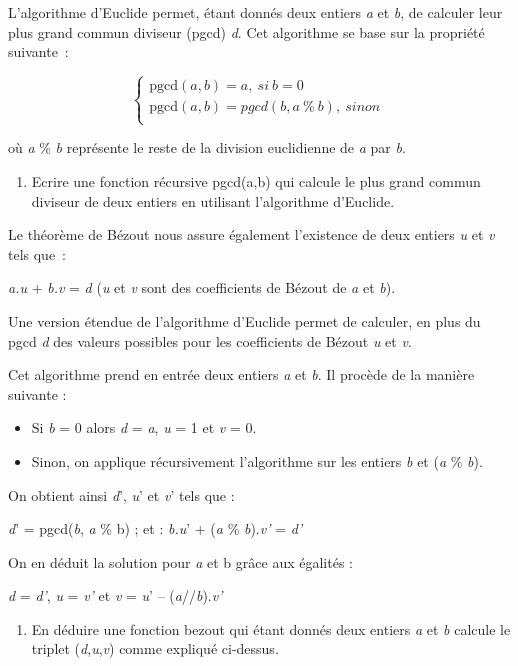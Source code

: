 \documentclass[
]{article}
\author{}
\date{}
\begin{document}
L'algorithme d'Euclide permet, étant donnés deux entiers \emph{a} et
\emph{b}, de calculer leur plus grand commun diviseur (pgcd) \emph{d}.
Cet algorithme se base sur la propriété suivante~:

\[\left\{ \begin{matrix}
\text{pgcd}\left( a,b \right) = a,\ si\ b = 0 \\
\text{pgcd}\left( a,b \right) = pgcd\left( b,a\ \%\ b \right),\ sinon \\
\end{matrix} \right.\ \]

où \emph{a} \% \emph{b} représente le reste de la division euclidienne
de \emph{a} par \emph{b}.

\begin{enumerate}
\def\labelenumi{\arabic{enumi}.}
\item
  Ecrire une fonction récursive pgcd(a,b) qui calcule le plus grand
  commun diviseur de deux entiers en utilisant l'algorithme d'Euclide.
\end{enumerate}

Le théorème de Bézout nous assure également l'existence de deux entiers
\emph{u} et \emph{v} tels que~:

\emph{a.u} + \emph{b.v} = \emph{d} (\emph{u} et \emph{v} sont des
coefficients de Bézout de \emph{a} et \emph{b}).

Une version étendue de l'algorithme d'Euclide permet de calculer, en
plus du pgcd \emph{d} des valeurs possibles pour les coefficients de
Bézout \emph{u} et \emph{v}.

Cet algorithme prend en entrée deux entiers \emph{a} et \emph{b}. Il
procède de la manière suivante :

\begin{itemize}
\item
  Si \emph{b} = 0 alors \emph{d} = \emph{a}, \emph{u} = 1 et \emph{v} =
  0.
\item
  Sinon, on applique récursivement l'algorithme sur les entiers \emph{b}
  et (\emph{a} \% \emph{b}).
\end{itemize}

On obtient ainsi \emph{d}', \emph{u}' et \emph{v}' tels que :

\emph{d}' = pgcd(\emph{b}, \emph{a} \% b) ; et : \emph{b.u}' + (\emph{a}
\% \emph{b}).\emph{v'} = \emph{d'}

On en déduit la solution pour \emph{a} et b grâce aux égalités :

\emph{d} = \emph{d'}, \emph{u} = \emph{v'} et \emph{v} = \emph{u}' --
(\emph{a}//\emph{b}).\emph{v'}

\begin{enumerate}
\def\labelenumi{\arabic{enumi}.}
\setcounter{enumi}{1}
\item
  En déduire une fonction bezout qui étant donnés deux entiers \emph{a}
  et \emph{b} calcule le triplet (\emph{d},\emph{u},\emph{v}) comme
  expliqué ci-dessus.
\end{enumerate}
\end{document}

